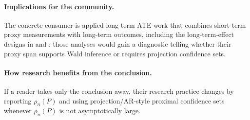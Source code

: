 \documentclass[11pt]{article}
\theoremstyle{definition}
\theoremstyle{plain}
\theoremstyle{remark}
\begin{document}
\paragraph{Implications for the community.}
The concrete consumer is applied long-term ATE work that combines short-term
proxy measurements with long-term outcomes, including the long-term-effect
designs in \cite{AtheyChettyImbensKang2019} and
\cite{ImbensKallusMaoWang2025}: those analyses would gain a diagnostic telling
whether their proxy span supports Wald inference or requires projection
confidence sets.

\paragraph{How research benefits from the conclusion.}
If a reader takes only the conclusion away, their research practice changes by
reporting $\rho_n(P)$ and using projection/AR-style proximal confidence sets
whenever $\rho_n(P)$ is not asymptotically large.
\end{document}
